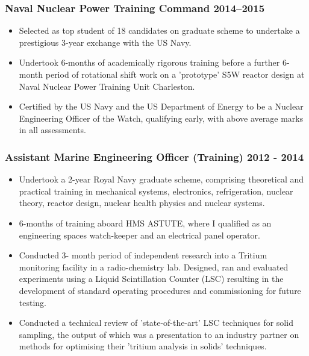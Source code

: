 \documentclass[a4paper, oneside, final, 11pt]{scrartcl} %
\begin{document}
\smallskip 
				
\subsubsection*{Naval Nuclear Power Training Command \hfill 2014--2015}  
\normalfont
\begin{itemize}
	\item Selected as top student of 18 candidates on graduate scheme to undertake a prestigious 3-year exchange with the US Navy. 
	
	\item Undertook 6-months of academically rigorous training before a further 6-month period of rotational shift work on a 'prototype' S5W reactor design at Naval Nuclear Power Training Unit Charleston. 
	\item Certified by the US Navy and the US Department of Energy to be a Nuclear Engineering Officer of the Watch, qualifying early, with above average marks in all assessments.
\end{itemize}

\smallskip  
				
\subsubsection*{Assistant Marine Engineering Officer (Training) \hfill 2012 - 2014}  
\normalfont
\begin{itemize}
	\item Undertook a 2-year Royal Navy graduate scheme, comprising theoretical and practical training in mechanical systems, electronics, refrigeration, nuclear theory, reactor design, nuclear health physics and nuclear systems. 
	\item 6-months of training aboard HMS ASTUTE, where I qualified as an engineering spaces watch-keeper and an electrical panel operator. 
	\item Conducted  3- month period of independent research into a Tritium monitoring facility in a radio-chemistry lab. Designed, ran and evaluated experiments using a Liquid Scintillation Counter (LSC) resulting in the development of standard operating procedures and commissioning for future testing. 
	\item Conducted a technical review of 'state-of-the-art' LSC techniques for solid sampling, the output of which was a presentation to an industry partner on methods for optimising their 'tritium analysis in solids' techniques.
\end{itemize}
\end{document}

